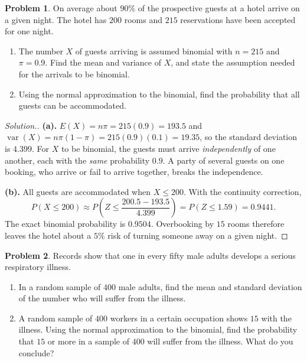 \documentclass[11pt,a4paper]{article}
\theoremstyle{definition}
\newtheorem{problemx}{Problem}[section]
\newenvironment{problem}{\begin{problemx}}{\end{problemx}}
\newenvironment{solution}
  {\renewcommand{\qedsymbol}{}\begin{proof}[\textit{Solution}.]}
  {\end{proof}}
\begin{document}
\pagebreak
\begin{problem}
On average about $90\%$ of the prospective guests at a hotel arrive on a given night.
The hotel has $200$ rooms and $215$ reservations have been accepted for one night.
\begin{enumerate}
\item[(a).] The number $X$ of guests arriving is assumed binomial with $n = 215$ and
$\pi = 0.9$. Find the mean and variance of $X$, and state the assumption needed for the
arrivals to be binomial.
\item[(b).] Using the normal approximation to the binomial, find the probability that
all guests can be accommodated.
\end{enumerate}
\end{problem}

\begin{solution}
\textbf{(a).} $E(X) = n\pi = 215(0.9) = 193.5$ and
$\operatorname{var}(X) = n\pi(1-\pi) = 215(0.9)(0.1) = 19.35$, so the standard deviation
is $4.399$. For $X$ to be binomial, the guests must arrive \emph{independently} of one
another, each with the \emph{same} probability $0.9$. A party of several guests on one
booking, who arrive or fail to arrive together, breaks the independence.

\textbf{(b).} All guests are accommodated when $X\leq 200$. With the continuity
correction,
\[P(X\leq 200)\approx P\left(Z\leq\frac{200.5-193.5}{4.399}\right) = P(Z\leq 1.59)
 = 0.9441.\]
The exact binomial probability is $0.9504$. Overbooking by $15$ rooms therefore
leaves the hotel about a $5\%$ risk of turning someone away on a given night.
\end{solution}

\begin{problem}
Records show that one in every fifty male adults develops a serious respiratory
illness.
\begin{enumerate}
\item[(a).] In a random sample of $400$ male adults, find the mean and standard
deviation of the number who will suffer from the illness.
\item[(b).] A random sample of $400$ workers in a certain occupation shows $15$ with
the illness. Using the normal approximation to the binomial, find the probability that
$15$ or more in a sample of $400$ will suffer from the illness. What do you conclude?
\end{enumerate}
\end{problem}
\end{document}
